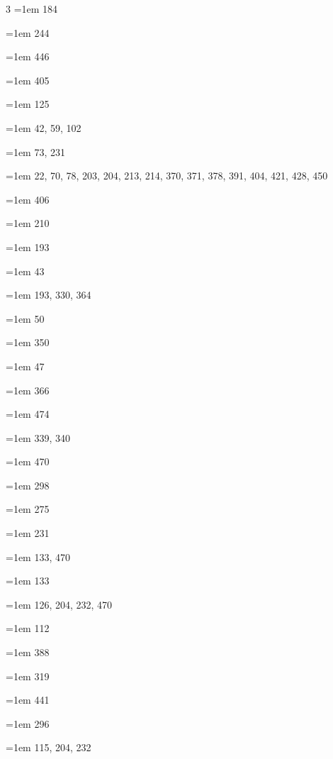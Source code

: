 \begin{multicols}{3}
\hangindent=1em  184\par
\hangindent=1em  244\par
\hangindent=1em  446\par
\hangindent=1em  405\par
\hangindent=1em  125\par
\hangindent=1em  42, 59, 102\par
\hangindent=1em  73, 231\par
\hangindent=1em  22, 70, 78, 203, 204, 213, 214, 370, 371, 378, 391, 404, 421, 428, 450\par
\hangindent=1em  406\par
\hangindent=1em  210\par
\hangindent=1em  193\par
\hangindent=1em  43\par
\hangindent=1em  193, 330, 364\par
\hangindent=1em  50\par
\hangindent=1em  350\par
\hangindent=1em  47\par
\hangindent=1em  366\par
\hangindent=1em  474\par
\hangindent=1em  339, 340\par
\hangindent=1em  470\par
\hangindent=1em  298\par
\hangindent=1em  275\par
\hangindent=1em  231\par
\hangindent=1em  133, 470\par
\hangindent=1em  133\par
\hangindent=1em  126, 204, 232, 470\par
\hangindent=1em  112\par
\hangindent=1em  388\par
\hangindent=1em  319\par
\hangindent=1em  441\par
\hangindent=1em  296\par
\hangindent=1em  115, 204, 232\par

\end{multicols}
